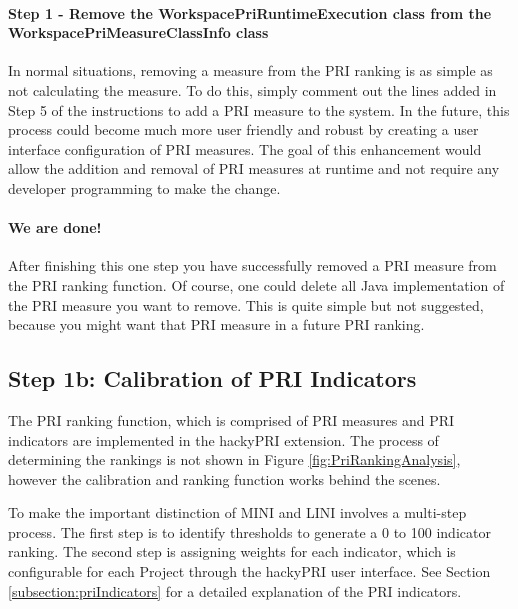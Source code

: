 \paragraph{Step 1 - Remove the WorkspacePriRuntimeExecution class from the
  WorkspacePriMeasureClassInfo class} In normal situations, removing a
measure from the PRI ranking is as simple as not calculating the measure.
To do this, simply comment out the lines added in Step 5 of the
instructions to add a PRI measure to the system. In the future, this
process could become much more user friendly and robust by creating a user
interface configuration of PRI measures. The goal of this enhancement would
allow the addition and removal of PRI measures at runtime and not require
any developer programming to make the change.

\paragraph{We are done!} 
After finishing this one step you have successfully removed a PRI measure
from the PRI ranking function. Of course, one could delete all Java implementation of the
PRI measure you want to remove. This is quite simple but not suggested,
because you  might want that PRI measure in a future PRI ranking.



\subsection{Step 1b: Calibration of PRI Indicators}
\label{subsection:step1b}
The PRI ranking function, which is comprised of PRI measures and PRI
indicators are implemented in the hackyPRI extension.  The process of
determining the rankings is not shown in Figure
\ref{fig:PriRankingAnalysis}, however the calibration and ranking
function works behind the scenes.

To make the important distinction of MINI and LINI involves a multi-step
process. The first step is to identify thresholds to generate a 0 to 100
indicator ranking. The second step is assigning weights for each indicator,
which is configurable for each Project through the hackyPRI user interface.
See Section \ref{subsection:priIndicators} for a detailed explanation of
the PRI indicators.


